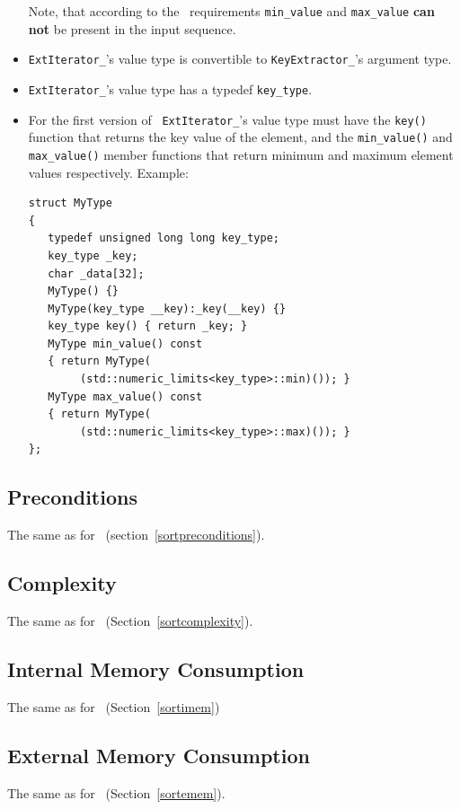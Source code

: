 \documentclass[twoside]{book}
\begin{document}
\begin{itemize}
 Note, that according to the \xsort\ requirements \texttt{min\_value}
and \texttt{max\_value} {\bf can not} be present in the input
sequence.
\item \texttt{ExtIterator\_}'s value type is convertible to
\texttt{KeyExtractor\_}'s argument type.

\item  \texttt{ExtIterator\_}'s value type has a typedef
\texttt{key\_type}. 

\item For the first version of \xksort\ \texttt{ExtIterator\_}'s value
type  must have the \texttt{key()} function that returns the key value
of the element, and the \texttt{min\_value()} and \texttt{max\_value()}
member functions that return minimum and maximum element values
respectively. Example:
\begin{lstlisting}
struct MyType
{
   typedef unsigned long long key_type;
   key_type _key;
   char _data[32];
   MyType() {}
   MyType(key_type __key):_key(__key) {}
   key_type key() { return _key; }
   MyType min_value() const 
   { return MyType(
        (std::numeric_limits<key_type>::min)()); }
   MyType max_value() const 
   { return MyType(
        (std::numeric_limits<key_type>::max)()); }
};
\end{lstlisting}

\end{itemize}

\subsection*{Preconditions}
The same as for \xsort\ (section~\ref{sortpreconditions}).

\subsection*{Complexity}
The same as for \xsort\ (Section~\ref{sortcomplexity}).

\subsection*{Internal Memory Consumption}
The same as for \xsort\ (Section~\ref{sortimem})

\subsection*{External Memory Consumption}
The same as for \xsort\ (Section~\ref{sortemem}).
\end{document}
